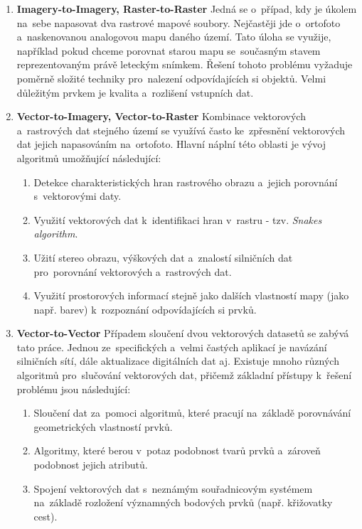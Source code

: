 \begin{enumerate}[leftmargin=*]
  \item \textbf{Imagery-to-Imagery, Raster-to-Raster}
    \subitem Jedná se o~případ, kdy je úkolem na~sebe napasovat dva rastrové 
      mapové soubory. Nejčastěji jde o~ortofoto a~naskenovanou analogovou mapu
      daného území. Tato úloha se využije, například pokud chceme porovnat 
      starou mapu se~současným stavem reprezentovaným právě leteckým snímkem. 
      Řešení tohoto problému vyžaduje poměrně složité techniky pro~nalezení 
      odpovídajících si objektů. Velmi důležitým prvkem je kvalita a~rozlišení
      vstupních dat.
  \item \textbf{Vector-to-Imagery, Vector-to-Raster}
    \subitem Kombinace vektorových a~rastrových dat stejného území se využívá 
      často ke~zpřesnění vektorových dat jejich napasováním na~ortofoto. Hlavní
      náplní této oblasti je vývoj algoritmů umožňující následující: %
	      \begin{enumerate}[leftmargin=*]
	       \item Detekce charakteristických hran rastrového obrazu a~jejich 
		  porovnání s~vektorovými daty.
	       \item Využití vektorových dat k~identifikaci hran v~rastru - tzv. 
		  \textit{Snakes algorithm}.
	       \item Užití stereo obrazu, výškových dat a~znalostí silničních dat
		  pro~porovnání vektorových a~rastrových dat. %
	       \item Využití prostorových informací stejně jako dalších vlastností
		  mapy (jako např. barev) k~rozpoznání odpovídajících si prvků.
	      \end{enumerate}
  \item \textbf{Vector-to-Vector}
    \subitem Případem sloučení dvou vektorových datasetů se zabývá tato práce. 
	Jednou ze~specifických a~velmi častých aplikací je navázání silničních 
	sítí, dále aktualizace digitálních dat aj. Existuje mnoho různých algoritmů
	pro~slučování vektorových dat, přičemž základní přístupy k~řešení problému 
	jsou následující: %
	      \begin{enumerate}[leftmargin=*]
	       \item Sloučení dat za~pomoci algoritmů, které pracují na~základě 
		  porovnávání geometrických vlastností prvků.
	       \item Algoritmy, které berou v~potaz podobnost tvarů prvků a~zároveň
		  podobnost jejich atributů.
	       \item Spojení vektorových dat s~neznámým souřadnicovým systémem 
		  na~základě rozložení významných bodových prvků (např. křižovatky 
		  cest).
	      \end{enumerate}

\end{enumerate}


